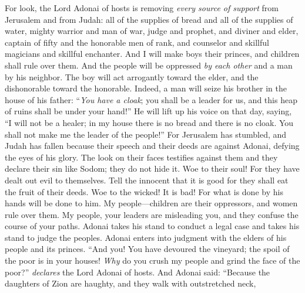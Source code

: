 \begin{biblechapter} %
 For look, the Lord Adonai of hosts is removing \textit{every source of support} 
from Jerusalem and from Judah: 
all of the supplies of bread 
and all of the supplies of water,
\verse mighty warrior and man of war, 
judge and prophet, 
and diviner and elder,
\verse captain of fifty and the honorable men of rank, 
and counselor and skillful magicians and skillful enchanter.
\verse And I will make boys their princes, 
and children shall rule over them.
\verse And the people will be oppressed \textit{by each other} 
and a man by his neighbor. 
The boy will act arrogantly toward the elder, 
and the dishonorable toward the honorable.
\verse Indeed, a man will seize his brother 
in the house of his father: 
“\textit{You have a cloak}; 
you shall be a leader for us, 
and this heap of ruins shall be under your hand!”
\verse He will lift up his voice on that day, saying, 
“I will not be a healer; 
in my house there is no bread 
and there is no cloak. 
You shall not make me the leader of the people!”
\verse For Jerusalem has stumbled, 
and Judah has fallen 
because their speech and their deeds are against Adonai, 
defying the eyes of his glory.
\verse The look on their faces testifies against them 
and they declare their sin like Sodom; 
they do not hide it. 
Woe to their soul! 
For they have dealt out evil to themselves.
\verse Tell the innocent that it is good 
for they shall eat the fruit of their deeds.
\verse Woe to the wicked! It is bad! 
For what is done by his hands will be done to him.
\verse My people—children are their oppressors, 
and women rule over them. 
My people, your leaders are misleading you, 
and they confuse the course of your paths.
\verse Adonai takes his stand to conduct a legal case 
and takes his stand to judge the peoples.
\verse Adonai enters into judgment with the elders of his people and its princes. 
“And you! You have devoured the vineyard; 
the spoil of the poor is in your houses!
\verse \textit{Why} do you crush my people 
and grind the face of the poor?” \textit{declares} the Lord Adonai of hosts.
 And Adonai said: “Because the daughters of Zion are haughty, 
and they walk with outstretched neck, 

\end{biblechapter}

